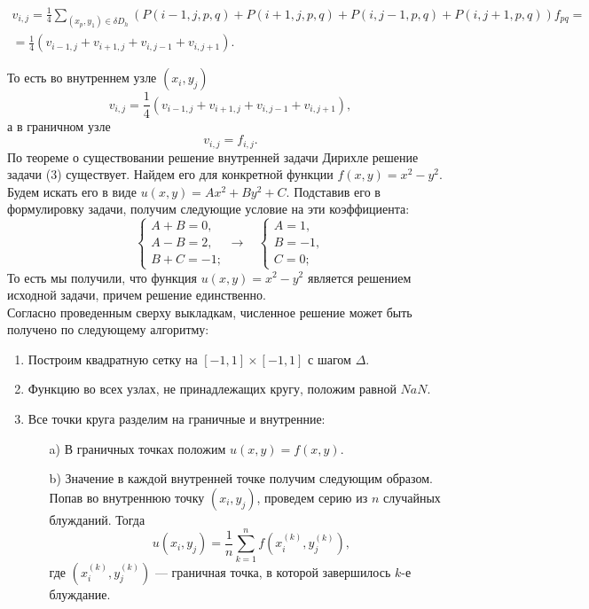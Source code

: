 \documentclass[11pt]{article}
\begin{document}
\begin{eqnarray*}
v_{i,j} = \frac{1}{4}\sum_{(x_p,y_1)\in \delta D_h}^{}(P(i-1,j,p,q) + P(i+1,j,p,q) + P(i,j-1,p,q) + P(i,j+1,p,q))f_{pq} = \\
=\frac{1}{4}(v_{i-1,j} + v_{i+1,j} + v_{i,j-1} + v_{i,j+1}).  
\end{eqnarray*}

То есть во внутреннем узле $(x_i,y_j)$
\[v_{i,j} = \frac{1}{4}(v_{i-1,j} + v_{i+1,j} + v_{i,j-1} + v_{i,j+1}), \]
а в граничном узле
\[ v_{i,j} = f_{i,j}. \]
По теореме о существовании решение внутренней задачи Дирихле решение задачи (3) существует. Найдем его для конкретной функции $f(x,y) = x^2 - y^2.$ Будем искать его в виде $u(x,y) = Ax^2 + By^2 + C.$ Подставив его в формулировку задачи, получим следующие условие на эти коэффициента:
\[ \begin{cases}
A + B = 0, \\
A - B = 2, \\
B + C = -1;
\end{cases}
\longrightarrow
\ \ \ \
\begin{cases}
A = 1,\\
B = -1,\\
C = 0;
\end{cases}
 \]
То есть мы получили, что функция $u(x,y) = x^2 - y^2$ является решением исходной задачи, причем решение единственно.\\
Согласно проведенным сверху выкладкам, численное решение может быть получено по следующему алгоритму:
\begin{enumerate}
	\item Построим квадратную сетку на $[-1,1]\times[-1,1]$ с шагом $\Delta$.
	\item Функцию во всех узлах, не принадлежащих кругу, положим равной $NaN$. 
	\item Все точки круга разделим на граничные и внутренние:
	\begin{enumerate}
		\item [a)] В граничных точках положим $u(x,y) = f(x,y).$
		\item [b)] Значение в каждой внутренней точке получим следующим образом. Попав во внутреннюю точку $(x_i,y_j)$, проведем серию из $n$ случайных блужданий. Тогда
		\[ u(x_i,y_j) = \frac{1}{n}\sum_{k=1}^{n}f(x_i^{(k)},y_j^{(k)}), \]
		где $(x_i^{(k)},y_j^{(k)})$ --- граничная точка, в которой завершилось $k$-е блуждание.
	\end{enumerate}
\end{enumerate}
\end{document}
